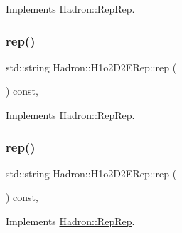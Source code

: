 Implements \mbox{\hyperlink{structHadron_1_1RepRep_ab3213025f6de249f7095892109575fde}{Hadron\+::\+Rep\+Rep}}.

\mbox{\label{structHadron_1_1H1o2D2ERep_ac801e3e5c50b7740398e08b907cae155}} 
\subsubsection{\texorpdfstring{rep()}{rep()}\hspace{0.1cm}{\footnotesize\ttfamily [2/5]}}
{\footnotesize\ttfamily std\+::string Hadron\+::\+H1o2\+D2\+E\+Rep\+::rep (\begin{DoxyParamCaption}{ }\end{DoxyParamCaption}) const\hspace{0.3cm}{\ttfamily [inline]}, {\ttfamily [virtual]}}



Implements \mbox{\hyperlink{structHadron_1_1RepRep_ab3213025f6de249f7095892109575fde}{Hadron\+::\+Rep\+Rep}}.

\mbox{\label{structHadron_1_1H1o2D2ERep_ac801e3e5c50b7740398e08b907cae155}} 
\subsubsection{\texorpdfstring{rep()}{rep()}\hspace{0.1cm}{\footnotesize\ttfamily [3/5]}}
{\footnotesize\ttfamily std\+::string Hadron\+::\+H1o2\+D2\+E\+Rep\+::rep (\begin{DoxyParamCaption}{ }\end{DoxyParamCaption}) const\hspace{0.3cm}{\ttfamily [inline]}, {\ttfamily [virtual]}}



Implements \mbox{\hyperlink{structHadron_1_1RepRep_ab3213025f6de249f7095892109575fde}{Hadron\+::\+Rep\+Rep}}.

\mbox{\label{structHadron_1_1H1o2D2ERep_ac801e3e5c50b7740398e08b907cae155}} 
